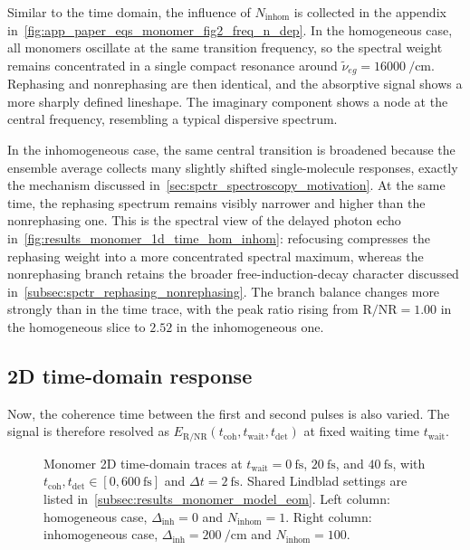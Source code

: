Similar to the time domain, the influence of $N_{\mathrm{inhom}}$ is collected in the appendix in~\autoref{fig:app_paper_eqs_monomer_fig2_freq_n_dep}. In the homogeneous case, all monomers oscillate at the same transition frequency, so the spectral weight remains concentrated in a single compact resonance around $\tilde{\nu}_{eg}=\SI{16000}{\per\centi\metre}$. Rephasing and nonrephasing are then identical, and the absorptive signal shows a more sharply defined lineshape. The imaginary component shows a node at the central frequency, resembling a typical dispersive spectrum.

In the inhomogeneous case, the same central transition is broadened because the ensemble average collects many slightly shifted single-molecule responses, exactly the mechanism discussed in~\autoref{sec:spctr_spectroscopy_motivation}. At the same time, the rephasing spectrum remains visibly narrower and higher than the nonrephasing one. This is the spectral view of the delayed photon echo in~\autoref{fig:results_monomer_1d_time_hom_inhom}: refocusing compresses the rephasing weight into a more concentrated spectral maximum, whereas the nonrephasing branch retains the broader free-induction-decay character discussed in~\autoref{subsec:spctr_rephasing_nonrephasing}. The branch balance changes more strongly than in the time trace, with the peak ratio rising from $\mathrm{R}/\mathrm{NR}=1.00$ in the homogeneous slice to $2.52$ in the inhomogeneous one.

\subsection{2D time-domain response}
\label{subsec:results_monomer_2d_time}

Now, the coherence time between the first and second pulses is also varied. The signal is therefore resolved as
$E_{\mathrm{R/NR}}(t_{\mathrm{coh}},t_{\mathrm{wait}},t_{\mathrm{det}})$
at fixed waiting time $t_{\mathrm{wait}}$.

\begin{figure}[htbp]
    \centering
  \caption{Monomer 2D time-domain traces at $t_{\mathrm{wait}}=\SI{0}{\femto\second}$, $\SI{20}{\femto\second}$, and $\SI{40}{\femto\second}$, with $t_{\mathrm{coh}},t_{\mathrm{det}}\in[0,\SI{600}{\femto\second}]$ and $\Delta t=\SI{2}{\femto\second}$. Shared Lindblad settings are listed in~\autoref{subsec:results_monomer_model_eom}.
  Left column: homogeneous case, $\Delta_{\mathrm{inh}}=0$ and $N_{\mathrm{inhom}}=1$.
  Right column: inhomogeneous case, $\Delta_{\mathrm{inh}}=\SI{200}{\per\centi\metre}$ and $N_{\mathrm{inhom}}=100$.}
    \label{fig:results_monomer_2d_time_hom_inhom}
\end{figure}

